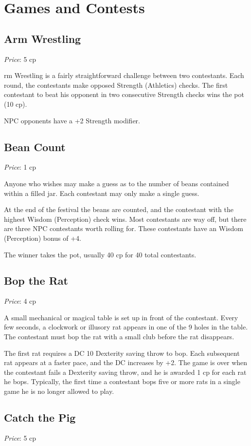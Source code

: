 \documentclass[10pt,a4paper,twoside,bg=print,twocolumn,openany,nodeprecatedcode]{dndbook}
\begin{document}
\chapter{Games and Contests}
\section{Arm Wrestling}
\textit{Price}: 5 cp

rm Wrestling is a fairly straightforward challenge between two contestants. Each round, the contestants make opposed Strength (Athletics) checks. The first contestant to beat his opponent in two consecutive Strength checks wins the pot (10 cp).


NPC opponents have a +2 Strength modifier.

\section{Bean Count}
\textit{Price}: 1 cp

Anyone who wishes may make a guess as to the number of beans contained within a filled jar. Each contestant may only make a single guess.

At the end of the festival the beans are counted, and the contestant with the highest Wisdom (Perception) check wins. Most contestants are way off, but there are three NPC contestants worth rolling for. These contestants have an Wisdom (Perception)  bonus of +4.

The winner takes the pot, usually 40 cp for 40 total contestants.

\section{Bop the Rat}
\textit{Price}: 4 cp

A small mechanical or magical table is set up in front of the contestant. Every few seconds, a clockwork or illusory rat appears in one of the 9 holes in the table. The contestant must bop the rat with a small club before the rat disappears.

The first rat requires a DC 10 Dexterity saving throw to bop. Each subsequent rat appears at a faster pace, and the DC increases by +2. The game is over when the contestant fails a Dexterity saving throw, and he is awarded 1 cp for each rat he bops. Typically, the first time a contestant bops five or more rats in a single game he is no longer allowed to play.

\section{Catch the Pig}
\textit{Price}: 5 cp
\end{document}
